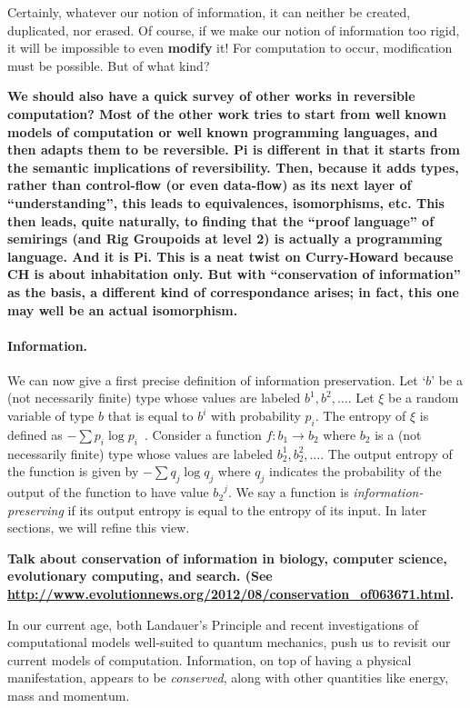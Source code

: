 \documentclass{article}
\newcommand{\amr}[1]{\fbox{Amr says:} \textbf{#1}}
\begin{document}
Certainly, whatever our notion of information, it can neither be created,
duplicated, nor erased. Of course, if we make our notion of information
too rigid, it will be impossible to even \textbf{modify} it! For computation
to occur, modification must be possible.  But of what kind?

\amr{We should also have a quick survey of other works in reversible
computation? Most of the other work tries to start from well known
models of computation or well known programming languages, and then
adapts them to be reversible. Pi is different in that it starts from
the semantic implications of reversibility. Then, because it adds
types, rather than control-flow (or even data-flow) as its next layer
of ``understanding'', this leads to equivalences, isomorphisms, etc.
This then leads, quite naturally, to finding that the ``proof
language'' of semirings (and Rig Groupoids at level 2) is actually a
programming language. And it is Pi. This is a neat twist on
Curry-Howard because CH is about \textbf{inhabitation} only. But with
``conservation of information'' as the basis, a different kind of
correspondance arises; in fact, this one may well be an actual
isomorphism.}

\paragraph*{Information.}
We can now give a first precise definition of information preservation.
Let
`$b$' be a (not necessarily finite) type whose values are labeled
$b^1, b^2, \ldots$. Let $\xi$ be a random variable of type $b$ that is
equal to $b^i$ with probability $p_i$. The entropy of $\xi$ is defined
as $-\sum p_i \log{p_i}$~\cite{Shannon1948}.  Consider a function
$f : b_1 \rightarrow b_2$ where $b_2$ is a (not necessarily finite)
type whose values are labeled $b_2^1, b_2^2, \ldots$. The output
entropy of the function is given by $- \sum q_j \log{q_j}$ where $q_j$
indicates the probability of the output of the function to have value
${b_2}^j$. We say a function is \emph{information-preserving} if its
output entropy is equal to the entropy of its input. In later sections,
we will refine this view.

\amr{
Talk about conservation of information in biology, computer science,
evolutionary computing, and search. (See
\url{http://www.evolutionnews.org/2012/08/conservation_of063671.html}.
}

In our current age, both Landauer's Principle and recent investigations
of computational models well-suited to quantum mechanics, push us to
revisit our current models of computation. Information, on top of
having a physical manifestation, appears to be \emph{conserved},
along with other quantities like energy, mass and momentum.
\end{document}
